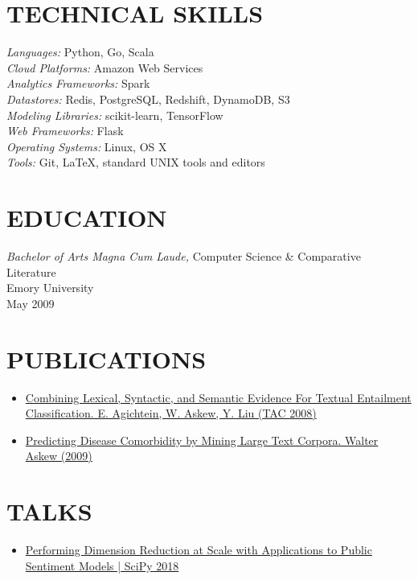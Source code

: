 \documentclass[line,margin]{res}
\begin{document}
\begin{resume}
\section{TECHNICAL SKILLS}
        {\sl Languages:} Python, Go, Scala \\
        {\sl Cloud Platforms:} Amazon Web Services\\
        {\sl Analytics Frameworks:} Spark \\
        {\sl Datastores:} Redis, PostgreSQL, Redshift, DynamoDB, S3 \\
        {\sl Modeling Libraries:} scikit-learn, TensorFlow  \\
        {\sl Web Frameworks:} Flask \\
        {\sl Operating Systems:} Linux, OS X\\
        {\sl Tools:} Git, \LaTeX, standard UNIX tools and editors

\section{EDUCATION}
        {\sl Bachelor of Arts Magna Cum Laude,}
        Computer Science \& Comparative Literature \\
        Emory University \\
        May 2009

\section{PUBLICATIONS}
\begin{itemize}
\item \href{http://www.nist.gov/tac/publications/2008/participant.papers/Emory.proceedings.pdf}{Combining Lexical, Syntactic, and Semantic Evidence For
  Textual Entailment Classification.  E. Agichtein, W. Askew, Y. Liu
  (TAC 2008)}
\item \href{https://etd.library.emory.edu/concern/etds/736664895}
  {Predicting Disease Comorbidity by Mining Large Text
    Corpora. Walter Askew (2009)}
\end{itemize}

\section{TALKS}
\begin{itemize}
  \item \href{https://www.youtube.com/watch?v=31YeSfDklfc}{Performing Dimension Reduction at Scale with Applications to Public Sentiment Models | SciPy 2018}
\end{itemize}

\end{resume}
\end{document}
